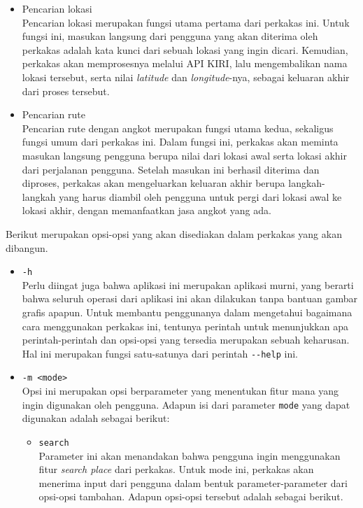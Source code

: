 \documentclass[a4paper,twoside]{article}
\begin{document}
\begin{enumerate}
\begin{itemize}
	\item Pencarian lokasi\\
	Pencarian lokasi merupakan fungsi utama pertama dari perkakas ini. Untuk fungsi ini, masukan langsung dari pengguna yang akan diterima oleh perkakas adalah kata kunci dari sebuah lokasi yang ingin dicari. Kemudian, perkakas akan memprosesnya melalui API KIRI, lalu \linebreak mengembalikan nama lokasi tersebut, serta nilai \textit{latitude} dan \textit{longitude}-nya, sebagai keluaran akhir dari proses tersebut.
	\item Pencarian rute\\
	Pencarian rute dengan angkot merupakan fungsi utama kedua, sekaligus fungsi umum dari \linebreak perkakas ini. Dalam fungsi ini, perkakas akan meminta masukan langsung pengguna berupa nilai \latlon dari lokasi awal serta lokasi akhir dari perjalanan pengguna. Setelah masukan ini berhasil diterima dan diproses, perkakas akan mengeluarkan keluaran akhir berupa langkah-langkah yang harus diambil oleh pengguna untuk pergi dari lokasi awal ke lokasi akhir, dengan memanfaatkan jasa angkot yang ada.
\end{itemize}
\noindent
Berikut merupakan opsi-opsi yang akan disediakan dalam perkakas yang akan dibangun.

\begin{itemize}
	\item \verb|-h|\\
	Perlu diingat juga bahwa aplikasi ini merupakan aplikasi \cl murni, yang berarti bahwa seluruh operasi dari aplikasi ini akan dilakukan tanpa bantuan gambar grafis apapun. Untuk membantu penggunanya dalam mengetahui bagaimana cara menggunakan perkakas ini, tentunya perintah untuk menunjukkan apa perintah-perintah dan opsi-opsi yang tersedia merupakan sebuah keharusan. Hal ini merupakan fungsi satu-satunya dari perintah \verb|--help| ini.
	
	\item \verb|-m <mode>|\\
	Opsi ini merupakan opsi berparameter yang menentukan fitur mana yang ingin digunakan oleh pengguna. Adapun isi dari parameter \verb|mode| yang dapat digunakan adalah sebagai berikut:
	
	\begin{itemize}	
		\item \verb|search|\\
		Parameter ini akan menandakan bahwa pengguna ingin menggunakan fitur \textit{search place} dari perkakas. Untuk mode ini, perkakas akan menerima input dari pengguna dalam bentuk parameter-parameter dari opsi-opsi tambahan. Adapun opsi-opsi tersebut adalah sebagai berikut.
			

\end{itemize}
\end{itemize}
\end{enumerate}
\end{document}
